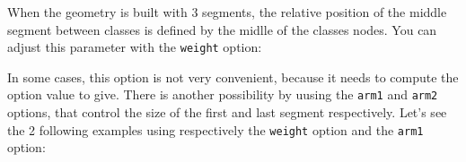 \documentclass[a4paper,11pt]{report}
\begin{document}
\medskip

\begin{minipage}{0.5\textwidth}

\end{minipage}
\begin{minipage}{0.4\textwidth}
\begin{center}
\end{center}
\end{minipage}

\medskip

When the geometry is built with 3 segments, the relative position of the middle segment between classes is defined by the midlle of the classes nodes. You can adjust this parameter with the \hypertarget{weight}{{\tt weight}} option:

\medskip

\begin{minipage}{0.5\textwidth}

\end{minipage}
\begin{minipage}{0.4\textwidth}
\begin{center}
\end{center}
\end{minipage}

In some cases, this option is not very convenient, because it needs to compute the option value to give.
There is another possibility by uusing the  \hypertarget{arm1}{{\tt arm1}} and  \hypertarget{arm2}{{\tt arm2}} options, that control the size 
of the first and last segment respectively. Let's see the 2 following examples using respectively the {\tt weight} option and the {\tt arm1} option:

\medskip

\begin{minipage}{0.5\textwidth}

\end{minipage}
\begin{minipage}{0.4\textwidth}
\begin{center}
\end{center}
\end{minipage}

\medskip

\begin{minipage}{0.5\textwidth}

\end{minipage}
\begin{minipage}{0.4\textwidth}
\begin{center}
\end{center}
\end{minipage}
\end{document}
